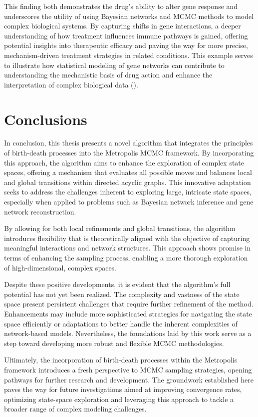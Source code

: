 \documentclass{report}
\begin{document}
	This finding both demonstrates the drug’s ability to alter gene response and underscores the utility of using Bayesian networks and MCMC methods to model complex biological systems. By capturing shifts in gene interactions, a deeper understanding of how treatment influences immune pathways is gained, offering potential insights into therapeutic efficacy and paving the way for more precise, mechanism-driven treatment strategies in related conditions. This example serves to illustrate how statistical modeling of gene networks can contribute to understanding the mechanistic basis of drug action and enhance the interpretation of complex biological data (\citet{mehta2022machine}).
	
	
\chapter{Conclusions}

In conclusion, this thesis presents a novel algorithm that integrates the principles of birth-death processes into the Metropolis MCMC framework. By incorporating this approach, the algorithm aims to enhance the exploration of complex state spaces, offering a mechanism that evaluates all possible moves and balances local and global transitions within directed acyclic graphs. This innovative adaptation seeks to address the challenges inherent to exploring large, intricate state spaces, especially when applied to problems such as Bayesian network inference and gene network reconstruction.

By allowing for both local refinements and global transitions, the algorithm introduces flexibility that is theoretically aligned with the objective of capturing meaningful interactions and network structures. This approach shows promise in terms of enhancing the sampling process, enabling a more thorough exploration of high-dimensional, complex spaces.

Despite these positive developments, it is evident that the algorithm's full potential has not yet been realized. The complexity and vastness of the state space present persistent challenges that require further refinement of the method. Enhancements may include more sophisticated strategies for navigating the state space efficiently or adaptations to better handle the inherent complexities of network-based models. Nevertheless, the foundations laid by this work serve as a step toward developing more robust and flexible MCMC methodologies.

Ultimately, the incorporation of birth-death processes within the Metropolis framework introduces a fresh perspective to MCMC sampling strategies, opening pathways for further research and development. The groundwork established here paves the way for future investigations aimed at improving convergence rates, optimizing state-space exploration and leveraging this approach to tackle a broader range of complex modeling challenges.
\end{document}
